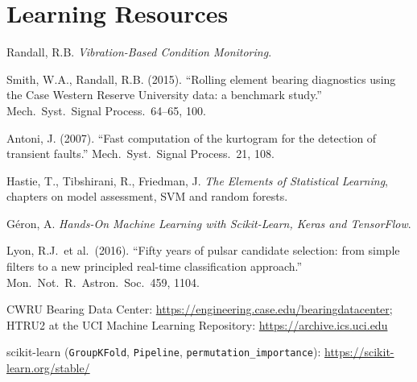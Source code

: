 \documentclass[11pt,a4paper]{article}
\begin{document}
\section*{Learning Resources}
\begin{resources}
  \item Randall, R.B. \emph{Vibration-Based Condition Monitoring}.
  \item Smith, W.A., Randall, R.B. (2015). ``Rolling element bearing diagnostics using the Case Western Reserve University data: a benchmark study.'' Mech.\ Syst.\ Signal Process.\ 64--65, 100.
  \item Antoni, J. (2007). ``Fast computation of the kurtogram for the detection of transient faults.'' Mech.\ Syst.\ Signal Process.\ 21, 108.
\end{resources}
\begin{resources}
  \item Hastie, T., Tibshirani, R., Friedman, J. \emph{The Elements of Statistical Learning}, chapters on model assessment, SVM and random forests.
  \item G\'eron, A. \emph{Hands-On Machine Learning with Scikit-Learn, Keras and TensorFlow}.
  \item Lyon, R.J.\ et al.\ (2016). ``Fifty years of pulsar candidate selection: from simple filters to a new principled real-time classification approach.'' Mon.\ Not.\ R.\ Astron.\ Soc.\ 459, 1104.
\end{resources}
\begin{resources}
  \item CWRU Bearing Data Center: \url{https://engineering.case.edu/bearingdatacenter}; HTRU2 at the UCI Machine Learning Repository: \url{https://archive.ics.uci.edu}
  \item scikit-learn (\texttt{GroupKFold}, \texttt{Pipeline}, \texttt{permutation\_importance}): \url{https://scikit-learn.org/stable/}
\end{resources}

\evaluation
\end{document}

